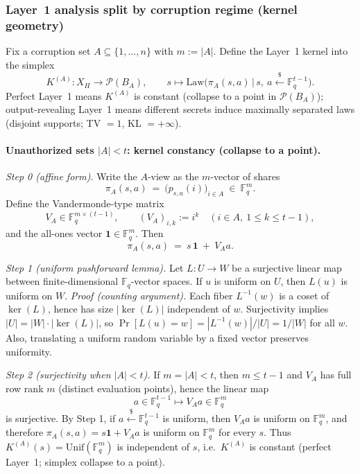 \documentclass[11pt,a4paper]{article}
\theoremstyle{definition}
\theoremstyle{plain}
\newcommand{\F}{\mathbb{F}}
\newcommand{\Prob}{\mathcal{P}}
\begin{document}
\subsubsection{Layer~1 analysis split by corruption regime (kernel geometry)}
Fix a corruption set $A\subseteq\{1,\dots,n\}$ with $m:=|A|$.
Define the Layer~1 kernel into the simplex
\[
K^{(A)}:X_H\to \Prob(B_A),\qquad
s\longmapsto \mathrm{Law}\!\bigl(\pi_A(s,a)\,\big|\,s,\ a\xleftarrow{\$}\F_q^{t-1}\bigr).
\]
Perfect Layer~1 means $K^{(A)}$ is constant (collapse to a point in $\Prob(B_A)$); output-revealing Layer~1 means different secrets induce maximally separated laws (disjoint supports; TV $=1$, KL $=+\infty$).

\paragraph{Unauthorized sets $|A|<t$: kernel constancy (collapse to a point).}
\emph{Step 0 (affine form).}
Write the $A$-view as the $m$-vector of shares
\[
\pi_A(s,a)\ =\ \bigl(p_{s,a}(i)\bigr)_{i\in A}\ \in\ \F_q^{m}.
\]
Define the Vandermonde-type matrix
\[
V_A\in\F_q^{m\times (t-1)},\qquad (V_A)_{i,k}:= i^k\quad (i\in A,\ 1\le k\le t-1),
\]
and the all-ones vector $\mathbf{1}\in\F_q^{m}$.
Then
\[
\pi_A(s,a)\ =\ s\,\mathbf{1}\ +\ V_A a.
\]

\emph{Step 1 (uniform pushforward lemma).}
Let $L:U\to W$ be a surjective linear map between finite-dimensional $\F_q$-vector spaces.
If $u$ is uniform on $U$, then $L(u)$ is uniform on $W$.
\emph{Proof (counting argument).}
Each fiber $L^{-1}(w)$ is a coset of $\ker(L)$, hence has size $|\ker(L)|$ independent of $w$.
Surjectivity implies $|U|=|W|\cdot |\ker(L)|$, so $\Pr[L(u)=w]=|L^{-1}(w)|/|U|=1/|W|$ for all $w$.
Also, translating a uniform random variable by a fixed vector preserves uniformity.

\emph{Step 2 (surjectivity when $|A|<t$).}
If $m=|A|<t$, then $m\le t-1$ and $V_A$ has full row rank $m$ (distinct evaluation points), hence the linear map
\[
a\in\F_q^{t-1}\longmapsto V_A a\in\F_q^{m}
\]
is surjective.
By Step 1, if $a\xleftarrow{\$}\F_q^{t-1}$ is uniform, then $V_A a$ is uniform on $\F_q^{m}$, and therefore $\pi_A(s,a)=s\mathbf{1}+V_Aa$ is uniform on $\F_q^{m}$ for every $s$.
Thus $K^{(A)}(s)=\mathrm{Unif}(\F_q^{m})$ is independent of $s$, i.e.\ $K^{(A)}$ is constant (perfect Layer~1; simplex collapse to a point).
\end{document}
